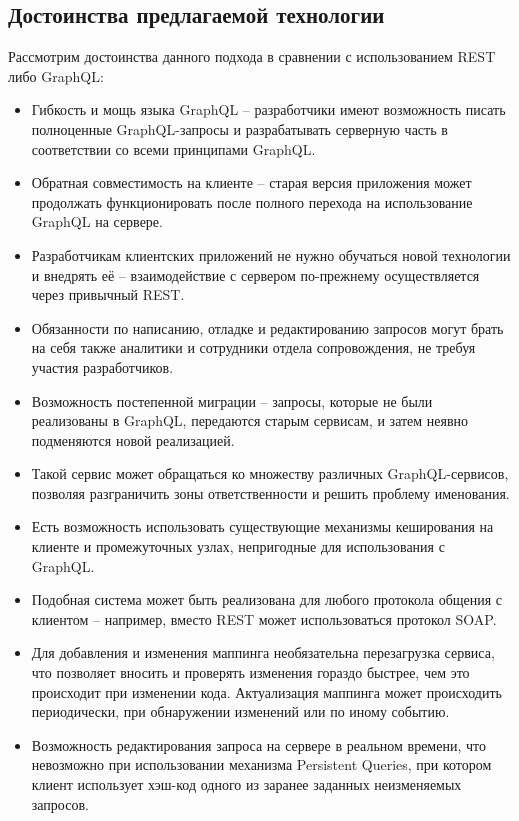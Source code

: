 \subsection{Достоинства предлагаемой технологии}\label{subsec:proposed-technology-advantages}

Рассмотрим достоинства данного подхода в сравнении с использованием REST либо GraphQL:

\begin{itemize}
	\item Гибкость и мощь языка GraphQL – разработчики имеют возможность писать полноценные GraphQL-запросы и разрабатывать серверную часть в соответствии со всеми принципами GraphQL\@.
	\item Обратная совместимость на клиенте – старая версия приложения может продолжать функционировать после полного перехода на использование GraphQL на сервере.
	\item Разработчикам клиентских приложений не нужно обучаться новой технологии и внедрять её – взаимодействие с сервером по-прежнему осуществляется через привычный REST\@.
	\item Обязанности по написанию, отладке и редактированию запросов могут брать на себя также аналитики и сотрудники отдела сопровождения, не требуя участия разработчиков.
	\item Возможность постепенной миграции – запросы, которые не были реализованы в GraphQL, передаются старым сервисам, и затем неявно подменяются новой реализацией.
	\item Такой сервис может обращаться ко множеству различных GraphQL-сервисов, позволяя разграничить зоны ответственности и решить проблему именования.
	\item Есть возможность использовать существующие механизмы кеширования на клиенте и промежуточных узлах, непригодные для использования с GraphQL\@.
	\item Подобная система может быть реализована для любого протокола общения с клиентом – например, вместо REST может использоваться протокол SOAP\@.
	\item Для добавления и изменения маппинга необязательна перезагрузка сервиса, что позволяет вносить и проверять изменения гораздо быстрее, чем это происходит при изменении кода.
	Актуализация маппинга может происходить периодически, при обнаружении изменений или по иному событию.
	\item Возможность редактирования запроса на сервере в реальном времени, что невозможно при использовании механизма Persistent Queries, при котором клиент использует хэш-код одного из заранее заданных неизменяемых запросов.

\end{itemize}
